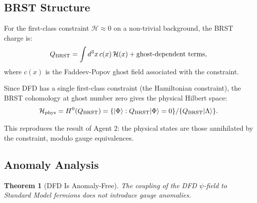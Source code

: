 \documentclass[11pt,a4paper]{article}
\newtheorem{theorem}{Theorem}
\begin{document}
\subsection{BRST Structure}

For the first-class constraint $\mathcal{H} \approx 0$ on a non-trivial background, the BRST charge is:
\begin{equation}
Q_{\rm BRST} = \int d^3x\, c(x)\,\mathcal{H}(x) + \text{ghost-dependent terms},
\end{equation}
where $c(x)$ is the Faddeev-Popov ghost field associated with the constraint.

Since DFD has a single first-class constraint (the Hamiltonian constraint), the BRST cohomology at ghost number zero gives the physical Hilbert space:
\begin{equation}
\mathcal{H}_{\rm phys} = H^0(Q_{\rm BRST}) = \{|\Phi\rangle : Q_{\rm BRST}|\Phi\rangle = 0\}/\{Q_{\rm BRST}|\Lambda\rangle\}.
\end{equation}

This reproduces the result of Agent 2: the physical states are those annihilated by the constraint, modulo gauge equivalences.

\subsection{Anomaly Analysis}

\begin{theorem}[DFD Is Anomaly-Free]
\label{thm:anomaly-free}
The coupling of the DFD $\psi$-field to Standard Model fermions does not introduce gauge anomalies.
\end{theorem}
\end{document}
